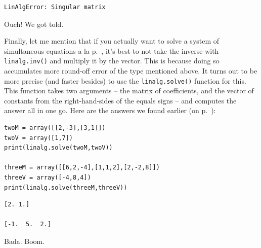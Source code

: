 \begin{Verbatim}[fontsize=\small,samepage=true,frame=leftline,framesep=5mm,framerule=1mm]
LinAlgError: Singular matrix
\end{Verbatim}
\vspace{-.2in}

Ouch! We got told.

\bigskip


Finally, let me mention that if you actually want to solve a system of
simultaneous equations a la p.~\pageref{threeEqsThreeUnknowns}, it's best to
not take the inverse with \texttt{linalg.inv()} and multiply it by the vector.
This is because doing so accumulates more round-off error of the type mentioned
above. It turns out to be more precise (and faster besides) to use the
\texttt{linalg.solve()} function for this. This function takes two arguments --
the matrix of coefficients, and the vector of constants from the
right-hand-sides of the equals signs -- and computes the answer all in one go.
Here are the answers we found earlier (on
p.~\pageref{threeEqsThreeUnknownsSol}):

\begin{Verbatim}[fontsize=\small,samepage=true,frame=single,framesep=3mm]
twoM = array([[2,-3],[3,1]])
twoV = array([1,7])
print(linalg.solve(twoM,twoV))

threeM = array([[6,2,-4],[1,1,2],[2,-2,8]])
threeV = array([-4,8,4])
print(linalg.solve(threeM,threeV))
\end{Verbatim}
\vspace{-.26in}

\begin{Verbatim}[fontsize=\small,samepage=true,frame=leftline,framesep=5mm,framerule=1mm]
[2. 1.]

[-1.  5.  2.]
\end{Verbatim}

Bada. Boom.
